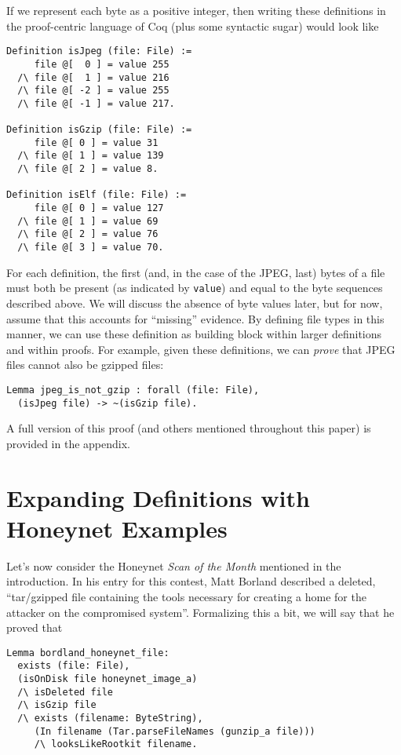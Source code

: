 \documentclass[nocopyrightspace]{sigplanconf}
\begin{document}
If we represent each byte as a positive integer, then writing these
definitions in the proof-centric language of Coq (plus some syntactic sugar)
would look like

\begin{lstlisting}
Definition isJpeg (file: File) :=
     file @[  0 ] = value 255
  /\ file @[  1 ] = value 216 
  /\ file @[ -2 ] = value 255
  /\ file @[ -1 ] = value 217.

Definition isGzip (file: File) :=
     file @[ 0 ] = value 31
  /\ file @[ 1 ] = value 139 
  /\ file @[ 2 ] = value 8.

Definition isElf (file: File) :=
     file @[ 0 ] = value 127
  /\ file @[ 1 ] = value 69 
  /\ file @[ 2 ] = value 76
  /\ file @[ 3 ] = value 70.
\end{lstlisting}

For each definition, the first (and, in the case of the JPEG, last) bytes of a
file must both be present (as indicated by {\tt value}) and equal to the byte
sequences described above. We will discuss the absence of byte values later,
but for now, assume that this accounts for ``missing'' evidence. By defining
file types in this manner, we can use these definition as building block
within larger definitions and within proofs. For example, given these
definitions, we can {\it prove} that JPEG files cannot also be gzipped files:

\begin{lstlisting}
Lemma jpeg_is_not_gzip : forall (file: File),
  (isJpeg file) -> ~(isGzip file).
\end{lstlisting}

A full version of this proof (and others mentioned throughout this paper) is
provided in the appendix.

\section{Expanding Definitions with Honeynet Examples}

Let's now consider the Honeynet {\it Scan of the Month} mentioned in the
introduction. In his entry for this contest, Matt 
Borland\cite{borland-honeynet} described a deleted, ``tar/gzipped file
containing the tools necessary for creating a home for the attacker on the
compromised system''. Formalizing this a bit, we will say that he proved that

\begin{lstlisting}
Lemma bordland_honeynet_file:
  exists (file: File),
  (isOnDisk file honeynet_image_a)
  /\ isDeleted file
  /\ isGzip file
  /\ exists (filename: ByteString),
     (In filename (Tar.parseFileNames (gunzip_a file)))
     /\ looksLikeRootkit filename.
\end{lstlisting}
\end{document}
